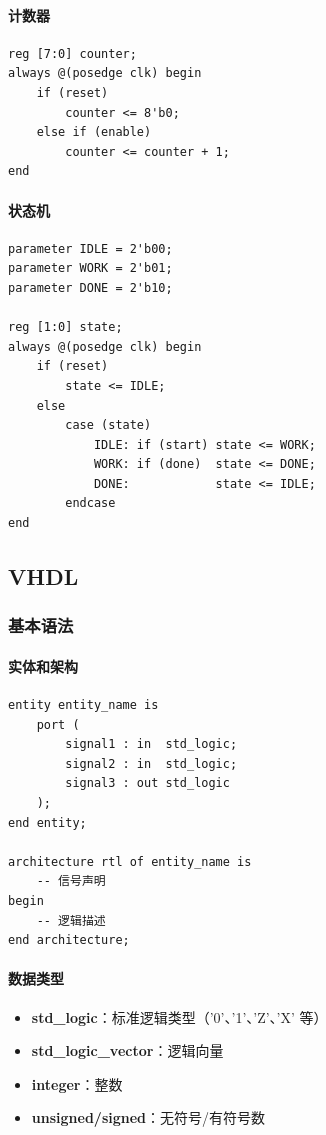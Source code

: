 \paragraph{计数器}

\begin{verbatim}
reg [7:0] counter;
always @(posedge clk) begin
    if (reset)
        counter <= 8'b0;
    else if (enable)
        counter <= counter + 1;
end
\end{verbatim}

\paragraph{状态机}

\begin{verbatim}
parameter IDLE = 2'b00;
parameter WORK = 2'b01;
parameter DONE = 2'b10;

reg [1:0] state;
always @(posedge clk) begin
    if (reset)
        state <= IDLE;
    else
        case (state)
            IDLE: if (start) state <= WORK;
            WORK: if (done)  state <= DONE;
            DONE:            state <= IDLE;
        endcase
end
\end{verbatim}

\subsection{VHDL}

\subsubsection{基本语法}

\paragraph{实体和架构}

\begin{verbatim}
entity entity_name is
    port (
        signal1 : in  std_logic;
        signal2 : in  std_logic;
        signal3 : out std_logic
    );
end entity;

architecture rtl of entity_name is
    -- 信号声明
begin
    -- 逻辑描述
end architecture;
\end{verbatim}

\paragraph{数据类型}

\begin{itemize}
  \item \textbf{std\_logic}：标准逻辑类型（'0'、'1'、'Z'、'X' 等）
  \item \textbf{std\_logic\_vector}：逻辑向量
  \item \textbf{integer}：整数
  \item \textbf{unsigned/signed}：无符号/有符号数
\end{itemize}

